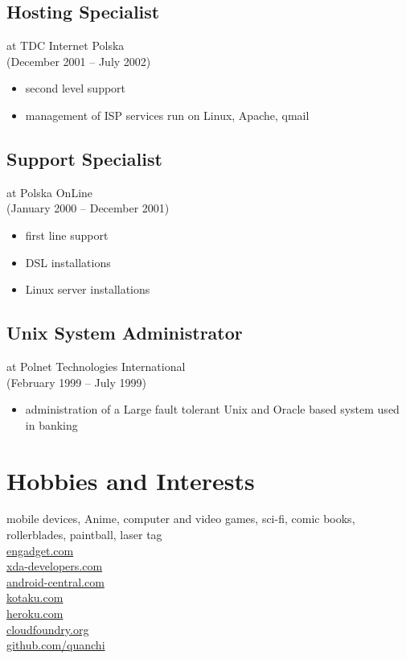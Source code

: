 \documentclass[9pt,a4paper,twocolumn]{extarticle}
\begin{document}
\subsection*{Hosting Specialist }
at TDC Internet Polska \\
(December 2001 – July 2002) 
\begin{itemize}
\setlength{\itemsep}{0cm}%
\setlength{\parskip}{0cm}%
\item second level support
\item management of ISP services run on Linux, Apache, qmail
\end{itemize}

\subsection*{Support Specialist }
at Polska OnLine \\
(January 2000 – December 2001) 
\begin{itemize}
\setlength{\itemsep}{0cm}%
\setlength{\parskip}{0cm}%
\item ﬁrst line support
\item DSL installations
\item Linux server installations
\end{itemize}

\subsection*{Unix System Administrator }
at Polnet Technologies International \\
(February 1999 – July 1999) 
\begin{itemize}
\setlength{\itemsep}{0cm}%
\setlength{\parskip}{0cm}%
\item administration of a Large fault tolerant Unix and Oracle based system used in banking 
\end{itemize}

\section*{Hobbies and Interests}

mobile devices, Anime, computer and video games, sci-fi, comic books, rollerblades, paintball, laser tag\\

\href{http://engadget.com}{engadget.com}\\
\href{http://xda-developers.com}{xda-developers.com}\\
\href{http://android-central.com}{android-central.com}\\
\href{http://kotaku.com}{kotaku.com}\\
\href{http://heroku.com}{heroku.com}\\
\href{http://cloudfoundry.org}{cloudfoundry.org}\\
\href{http://github.com/quanchi}{github.com/quanchi}\\
\end{document}

